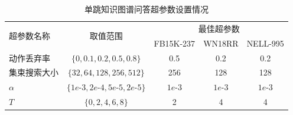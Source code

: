 \documentclass[algorithmlist, AutoFakeBold, AutoFakeSlant, figurelist, tablelist, nomlist, engineering]{seuthesix}
\begin{document}
\begin{table}[]
  \centering
  \begin{tabular*}{0.95\textwidth}{@{\extracolsep{\fill}}lcccc}
  \toprule[1pt]
  \multirow{2}{*}{超参数名称} & \multirow{2}{*}{取值范围} & \multicolumn{3}{c}{最佳超参数}\\ 
    &  & FB15K-237 & WN18RR & NELL-995 \\ \hline
  动作丢弃率 & $\{0, 0.1, 0.2, 0.5, 0.8\}$ & 0.5 & 0.2 & 0.2 \\
  集束搜索大小 & $\{32, 64, 128, 256, 512\}$ & 256 & 128 & 128 \\
  $\alpha$ & $\{1e\text{-}3, 2e\text{-}4, 5e\text{-}5, 2e\text{-}5\}$ & $1e\text{-}3$ & $1e\text{-}3$ & $1e\text{-}3$ \\
  $T$ & $\{0, 2, 4, 6, 8\}$ & 2 & 4 & 4 \\
  \bottomrule[1pt]
  \end{tabular*}
  \caption{单跳知识图谱问答超参数设置情况}
  \label{Hyperparameters2_Singlehop}
\end{table}
\end{document}
